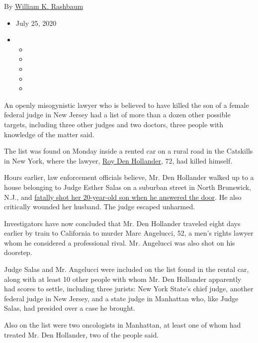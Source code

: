 By
\href{https://www.nytimes3xbfgragh.onion/by/william-k-rashbaum}{William
K. Rashbaum}

\begin{itemize}
\item
  July 25, 2020
\item
  \begin{itemize}
  \item
  \item
  \item
  \item
  \item
  \end{itemize}
\end{itemize}

An openly misogynistic lawyer who is believed to have killed the son of
a female federal judge in New Jersey had a list of more than a dozen
other possible targets, including three other judges and two doctors,
three people with knowledge of the matter said.

The list was found on Monday inside a rented car on a rural road in the
Catskills in New York, where the lawyer,
\href{https://www.nytimes3xbfgragh.onion/2020/07/25/nyregion/roy-den-hollander-esther-salas-list.html}{Roy
Den Hollander}, 72, had killed himself.

Hours earlier, law enforcement officials believe, Mr. Den Hollander
walked up to a house belonging to Judge Esther Salas on a suburban
street in North Brunswick, N.J., and
\href{https://www.nytimes3xbfgragh.onion/2020/07/20/nyregion/esther-salas.html}{fatally
shot her 20-year-old son when he answered the door}. He also critically
wounded her husband. The judge escaped unharmed.

Investigators have now concluded that Mr. Den Hollander traveled eight
days earlier by train to California to murder Marc Angelucci, 52, a
men's rights lawyer whom he considered a professional rival. Mr.
Angelucci was also shot on his doorstep.

Judge Salas and Mr. Angelucci were included on the list found in the
rental car, along with at least 10 other people with whom Mr. Den
Hollander apparently had scores to settle, including three jurists: New
York State's chief judge, another federal judge in New Jersey, and a
state judge in Manhattan who, like Judge Salas, had presided over a case
he brought.

Also on the list were two oncologists in Manhattan, at least one of whom
had treated Mr. Den Hollander, two of the people said.

